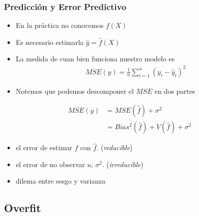 \documentclass[
  shownotes,
  xcolor={svgnames},
  hyperref={colorlinks,citecolor=DarkBlue,linkcolor=DarkRed,urlcolor=DarkBlue}
  , aspectratio=169]{beamer}
\begin{document}
\begin{frame}
\frametitle{Predicción y Error Predictivo}

\begin{itemize}
  \item En la práctica no conocemos $f(X)$
  \medskip
  \item Es necesario estimarla $\hat y = \hat f(X)$ 
  \medskip
  \item La medida de cuan bien funciona nuestro modelo es 
    \begin{align}
      MSE(y)= \frac{1}{n} \sum_{i=1}^n (y_i - \hat{y}_i )^2
    \end{align}
  
  \item Notemos que podemos descomponer el $MSE$ en dos partes
\end{itemize}

\begin{align}
  MSE (  y )  &= MSE(\hat f) + \sigma^2  \\  
  &= Bias^2(\hat f) + V(\hat f) +  \sigma^2
\end{align}

\begin{itemize}
  \item  el error de estimar $f$ con $\hat f$. (\emph{reducible})
  \item  el error de no observar $u$, $\sigma^2$. (\emph{irreducible})
  \item  dilema entre sesgo y varianza
\end{itemize}

\medskip

\end{frame}



\subsection{Overfit}
\end{document}
